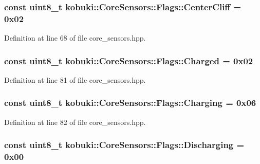 \subsubsection[{\-Center\-Cliff}]{\setlength{\rightskip}{0pt plus 5cm}const uint8\-\_\-t {\bf kobuki\-::\-Core\-Sensors\-::\-Flags\-::\-Center\-Cliff} = 0x02\hspace{0.3cm}{\ttfamily  [static]}}\label{structkobuki_1_1CoreSensors_1_1Flags_a1b5e6cb42d25bec2e9030341f4b8df4b}


\-Definition at line 68 of file core\-\_\-sensors.\-hpp.

\subsubsection[{\-Charged}]{\setlength{\rightskip}{0pt plus 5cm}const uint8\-\_\-t {\bf kobuki\-::\-Core\-Sensors\-::\-Flags\-::\-Charged} = 0x02\hspace{0.3cm}{\ttfamily  [static]}}\label{structkobuki_1_1CoreSensors_1_1Flags_a37a146ce9d17489e29223cf8eda52731}


\-Definition at line 81 of file core\-\_\-sensors.\-hpp.

\subsubsection[{\-Charging}]{\setlength{\rightskip}{0pt plus 5cm}const uint8\-\_\-t {\bf kobuki\-::\-Core\-Sensors\-::\-Flags\-::\-Charging} = 0x06\hspace{0.3cm}{\ttfamily  [static]}}\label{structkobuki_1_1CoreSensors_1_1Flags_a944248c28c8097de503af120b1afe3e6}


\-Definition at line 82 of file core\-\_\-sensors.\-hpp.

\subsubsection[{\-Discharging}]{\setlength{\rightskip}{0pt plus 5cm}const uint8\-\_\-t {\bf kobuki\-::\-Core\-Sensors\-::\-Flags\-::\-Discharging} = 0x00\hspace{0.3cm}{\ttfamily  [static]}}\label{structkobuki_1_1CoreSensors_1_1Flags_a7478f59ea180abc589c314a9be8c6d52}


